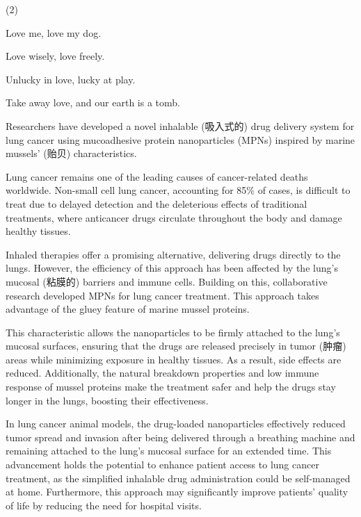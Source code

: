 \documentclass{英语试卷}
\begin{document}
\begin{choices}(2)
  \item Love me, love my dog.
  \item Love wisely, love freely.
  \item Unlucky in love, lucky at play.
  \item Take away love, and our earth is a tomb.
\end{choices}
\par Researchers have developed a novel inhalable (吸入式的) drug delivery system for lung cancer using mucoadhesive protein nanoparticles (MPNs) inspired by marine mussels' (贻贝) characteristics.\par
\par Lung cancer remains one of the leading causes of cancer-related deaths worldwide. Non-small cell lung cancer, accounting for 85\% of cases, is difficult to treat due to delayed detection and the deleterious effects of traditional treatments, where anticancer drugs circulate throughout the body and damage healthy tissues.\par
\par Inhaled therapies offer a promising alternative, delivering drugs directly to the lungs. However, the efficiency of this approach has been affected by the lung's mucosal (粘膜的) barriers and immune cells. Building on this, collaborative research developed MPNs for lung cancer treatment. This approach takes advantage of the gluey feature of marine mussel proteins.\par
\par This characteristic allows the nanoparticles to be firmly attached to the lung's mucosal surfaces, ensuring that the drugs are released precisely in tumor (肿瘤) areas while minimizing exposure in healthy tissues. As a result, side effects are reduced. Additionally, the natural breakdown properties and low immune response of mussel proteins make the treatment safer and help the drugs stay longer in the lungs, boosting their effectiveness.\par
\par In lung cancer animal models, the drug-loaded nanoparticles effectively reduced tumor spread and invasion after being delivered through a breathing machine and remaining attached to the lung's mucosal surface for an extended time. This advancement holds the potential to enhance patient access to lung cancer treatment, as the simplified inhalable drug administration could be self-managed at home. Furthermore, this approach may significantly improve patients' quality of life by reducing the need for hospital visits.\par
\end{document}
